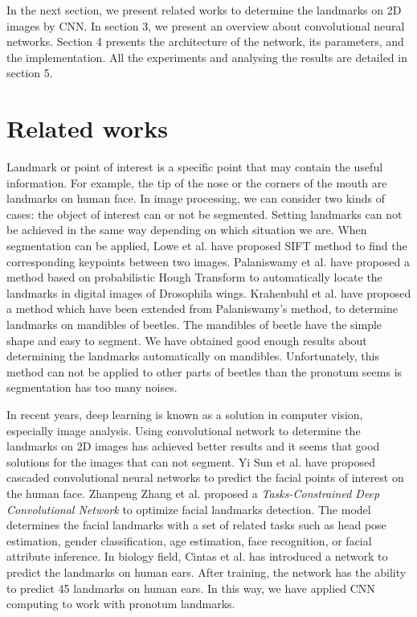 \documentclass[conference]{IEEEtran}
\begin{document}
In the next section, we present related works to determine the landmarks on 2D images by CNN. In section 3, we present an overview about convolutional neural networks. Section 4 presents the architecture of the network, its parameters, and the implementation. All the experiments and analysing the results are detailed in section 5.
\section{Related works}
Landmark or point of interest is a specific point that may contain the useful information. For example, the tip of the nose or the corners of the mouth are landmarks on human face. In image processing, we can consider two kinds of cases: the object of interest can or not be segmented. Setting landmarks can not be achieved in the same way depending on which situation we are. When segmentation can be applied, Lowe et al. \cite{lowe2004distinctive} have proposed SIFT method to find the corresponding keypoints between two images. Palaniswamy et al. \cite{palaniswamy2010automatic} have proposed a method based on probabilistic Hough Transform to automatically locate the landmarks in digital images of Drosophila wings. Krahenbuhl et al. \cite{le2017maelab} have proposed a method which have been extended from Palaniswamy's method, to determine landmarks on mandibles of beetles. The mandibles of beetle have the simple shape and easy to segment. We have obtained good enough results about determining the landmarks automatically on mandibles. Unfortunately, this method can not be applied to other parts of beetles than the pronotum seems is segmentation has too many noises.

In recent years, deep learning is known as a solution in computer vision, especially image analysis. Using convolutional network to determine the landmarks on 2D images has achieved better results and it seems that good solutions for the images that can not segment. Yi Sun et al. \cite{sun2013deep} have proposed cascaded convolutional neural networks to predict the facial points of interest on the human face.
Zhanpeng Zhang et al. \cite{zhang2014facial} proposed a \textit{Tasks-Constrained Deep Convolutional Network} to optimize facial landmarks detection. The model determines the facial landmarks with a set of related tasks such as head pose estimation, gender classification, age estimation, face recognition, or facial attribute inference. In biology field, Cintas et al. \cite{cintas2016automatic} has introduced a network to predict the landmarks on human ears. After training, the network has the ability to predict 45 landmarks on human ears. In this way, we have applied CNN computing to work with pronotum landmarks.
\end{document}
